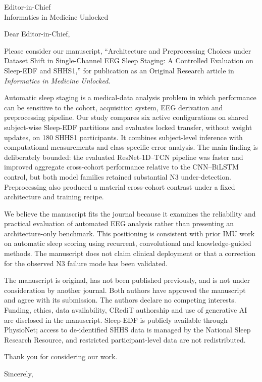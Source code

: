 \documentclass[11pt,a4paper]{letter}
\date{\today}
\begin{document}
\begin{letter}{Editor-in-Chief\\Informatics in Medicine Unlocked}

\opening{Dear Editor-in-Chief,}

Please consider our manuscript, ``Architecture and Preprocessing Choices under Dataset Shift in
Single-Channel EEG Sleep Staging: A Controlled Evaluation on Sleep-EDF and SHHS1,'' for publication as
an Original Research article in \emph{Informatics in Medicine Unlocked}.

Automatic sleep staging is a medical-data analysis problem in which performance can be sensitive to the
cohort, acquisition system, EEG derivation and preprocessing pipeline. Our study compares six active
configurations on shared subject-wise Sleep-EDF partitions and evaluates locked transfer, without weight
updates, on 180 SHHS1 participants. It combines subject-level inference with computational measurements
and class-specific error analysis. The main finding is deliberately bounded: the evaluated
ResNet-1D--TCN pipeline was faster and improved aggregate cross-cohort performance relative to the
CNN--BiLSTM control, but both model families retained substantial N3 under-detection. Preprocessing also
produced a material cross-cohort contrast under a fixed architecture and training recipe.

We believe the manuscript fits the journal because it examines the reliability and practical evaluation
of automated EEG analysis rather than presenting an architecture-only benchmark. This positioning is
consistent with prior IMU work on automatic sleep scoring using recurrent, convolutional and
knowledge-guided methods. The manuscript does not claim clinical deployment or that a correction for the
observed N3 failure mode has been validated.

The manuscript is original, has not been published previously, and is not under consideration by another
journal. Both authors have approved the manuscript and agree with its submission. The authors declare no
competing interests. Funding, ethics, data availability, CRediT authorship and use of generative AI are
disclosed in the manuscript. Sleep-EDF is publicly available through PhysioNet; access to de-identified
SHHS data is managed by the National Sleep Research Resource, and restricted participant-level data are
not redistributed.

Thank you for considering our work.

\closing{Sincerely,}

\end{letter}
\end{document}
